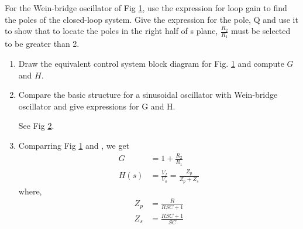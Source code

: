 For the Wein-bridge oscillator of Fig \ref{fig:ee18btech11044_3_tikz_1}, use the expression for loop gain to find the poles of the closed-loop system. Give the expression for the pole, Q and use it to show that to locate the poles in the right half of s plane, $\frac{R_2}{R_1}$ must be selected to be greater than 2. \begin{figure}[!hbt]
	\begin{center}
			\resizebox{\columnwidth}{!}{}
	\end{center}
\caption{}
\label{fig:ee18btech11044_3_tikz_1}
\end{figure}

\begin{enumerate}[label=\arabic*.,ref=\theenumi]

\item  Draw the equivalent control system block diagram for Fig. \ref{fig:ee18btech11044_3_tikz_1} and compute $G$ and $H$.
%
\\
\solution 



\item Compare the basic structure for a sinusoidal oscillator with Wein-bridge oscillator and give expressions for G and H. 
\begin{figure}[!hbt]
	\begin{center}
		\resizebox{\columnwidth}{!}{}
	\end{center}
\caption{}
\label{fig:ee18btech11044_3_tikz_2}
\end{figure} 

\solution See Fig \ref{fig:ee18btech11044_3_tikz_2}.
 \item Comparring Fig \ref{fig:ee18btech11044_3_tikz_1} and , we get
\begin{align}
G &= 1+\frac{R_2}{R_1} 
\label{eq:ee18btech11044_3_1}\\
H(s) &= \frac{V_f}{V_o} = \frac{Z_p}{Z_p + Z_s}  
\label{eq:ee18btech11044_3_2}
\end{align}
where,
\begin{align}
    Z_p &= \frac{R}{RSC+1} \\
    Z_s &= \frac{RSC+1}{SC}
\end{align}







\end{enumerate}
